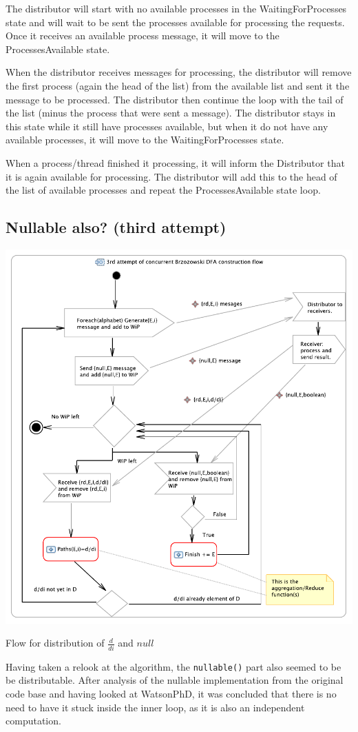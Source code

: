 \documentclass[a4paper,11pt]{report}
\begin{document}
The distributor will start with no available processes in the
WaitingForProcesses state and will wait to be sent the processes
available for processing the requests. Once it receives an available
process message, it will move to the ProcessesAvailable state.

When the distributor receives messages for processing, the distributor
will remove the first process (again the head of the list) from the
available list and sent it the message to be processed. The
distributor then continue the loop with the tail of the list (minus
the process that were sent a message). The distributor stays in this
state while it still have processes available, but when it do not have
any available processes, it will move to the WaitingForProcesses
state.

When a process/thread finished it processing, it will inform the
Distributor that it is again available for processing. The distributor
will add this to the head of the list of available processes and
repeat the ProcessesAvailable state loop.




\subsection{Nullable also? (third attempt)}
\begin{Figure}[htb] %
	 \centering
	 \includegraphics[scale=1]{Activity-3null.pdf} 
	 \caption{Flow for distribution of $\frac{d}{di}$ and $null$}
	 \label{fig:distflownull}
\end{Figure}
Having taken a relook at the algorithm, the \texttt{nullable()} part
also seemed to be be distributable. After analysis of the nullable
implementation from the original code base and having looked at
Watson\cite{watson}PhD, it was concluded that there is no need to have
it stuck inside the inner loop, as it is also an independent
computation.
\end{document}

